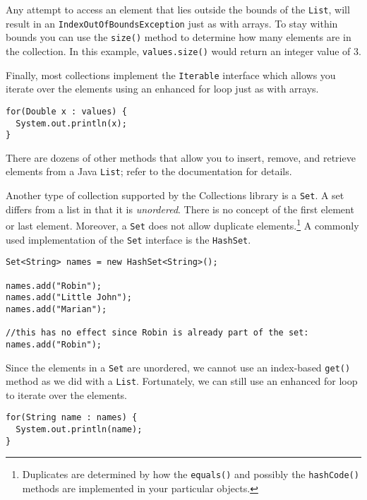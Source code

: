 Any attempt to access an element that lies outside the bounds of
the \texttt{List}, will
result in an \texttt{IndexOutOfBoundsException} just as 
with arrays.  To stay within bounds you can use the \texttt{size()}
method to determine how many elements are in the collection.
In this example, \texttt{values.size()} would return an 
integer value of 3.

Finally, most collections implement the \texttt{Iterable}
interface which allows you iterate over the elements using an 
enhanced for loop just as with arrays.

\begin{verbatim}
for(Double x : values) {
  System.out.println(x);
}
\end{verbatim}

There are dozens of other methods that allow you to insert, remove, and
retrieve elements from a Java \texttt{List}; refer to the documentation
for details.

Another type of collection supported by the Collections library is a 
\texttt{Set}.  A set  differs from a 
list in that it is \emph{unordered}.  There is no concept of the first element
or last element.  Moreover, a \texttt{Set} does not allow 
duplicate elements.\footnote{Duplicates
are determined by how the \texttt{equals()} and possibly the
\texttt{hashCode()} methods are implemented in your particular
objects.}  A commonly used implementation of the \texttt{Set}
interface is the \texttt{HashSet}.  

\begin{verbatim}
Set<String> names = new HashSet<String>();

names.add("Robin");
names.add("Little John");
names.add("Marian");

//this has no effect since Robin is already part of the set:
names.add("Robin");
\end{verbatim}

Since the elements in a \texttt{Set} are unordered, 
we cannot use an index-based \texttt{get()} method
as we did with a \texttt{List}.  Fortunately, we can 
still use an enhanced for loop to iterate over the elements.

\begin{verbatim}
for(String name : names) {
  System.out.println(name);
}
\end{verbatim}

